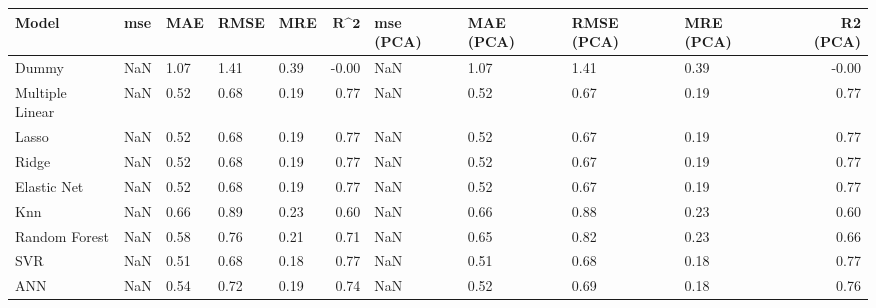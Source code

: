 \begin{table}
\centering
\label{table:iri_reg_pred}
\begin{tabular}{lllllrllllr}
\toprule
 \textbf{Model} & \textbf{mse} & \textbf{MAE} & \textbf{RMSE} & \textbf{MRE} & $\textbf{R^2}$ & \textbf{mse (PCA)} & \textbf{MAE (PCA)} & \textbf{RMSE (PCA)} & \textbf{MRE (PCA)} & \textbf{R2 (PCA)} \\
\midrule
          Dummy &          NaN &         1.07 &          1.41 &         0.39 &          -0.00 &                NaN &               1.07 &                1.41 &               0.39 &             -0.00 \\
Multiple Linear &          NaN &         0.52 &          0.68 &         0.19 &           0.77 &                NaN &               0.52 &                0.67 &               0.19 &              0.77 \\
          Lasso &          NaN &         0.52 &          0.68 &         0.19 &           0.77 &                NaN &               0.52 &                0.67 &               0.19 &              0.77 \\
          Ridge &          NaN &         0.52 &          0.68 &         0.19 &           0.77 &                NaN &               0.52 &                0.67 &               0.19 &              0.77 \\
    Elastic Net &          NaN &         0.52 &          0.68 &         0.19 &           0.77 &                NaN &               0.52 &                0.67 &               0.19 &              0.77 \\
            Knn &          NaN &         0.66 &          0.89 &         0.23 &           0.60 &                NaN &               0.66 &                0.88 &               0.23 &              0.60 \\
  Random Forest &          NaN &         0.58 &          0.76 &         0.21 &           0.71 &                NaN &               0.65 &                0.82 &               0.23 &              0.66 \\
            SVR &          NaN &         0.51 &          0.68 &         0.18 &           0.77 &                NaN &               0.51 &                0.68 &               0.18 &              0.77 \\
            ANN &          NaN &         0.54 &          0.72 &         0.19 &           0.74 &                NaN &               0.52 &                0.69 &               0.18 &              0.76 \\
\bottomrule
\end{tabular}
\end{table}
